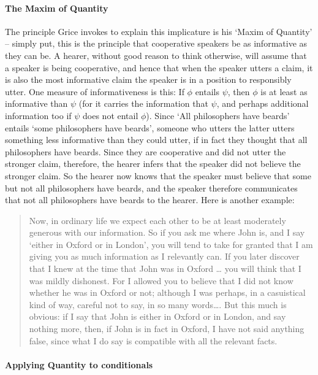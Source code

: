 \paragraph{The Maxim of Quantity}
The principle Grice invokes to explain this implicature is his `Maxim of Quantity' – simply put, this is the principle that cooperative speakers be as informative as they can be. A hearer, without good reason to think otherwise, will assume that a speaker is being cooperative, and hence that when the speaker utters a claim, it is also the most informative claim the speaker is in a position to responsibly utter. One measure of informativeness is this: If $\phi$ entails $\psi$, then $\phi$ is at least as informative than $\psi$ (for it carries the information that $\psi$, and perhaps additional information too if $\psi$ does not entail $\phi$). Since `All philosophers have beards' entails `some philosophers have beards', someone who utters the latter utters something less informative than they could utter, if in fact they thought that all philosophers have beards. Since they are cooperative and did not utter the stronger claim, therefore, the hearer infers that the speaker did not believe the stronger claim. So the hearer now knows that the speaker must believe that some but not all philosophers have beards, and the speaker therefore communicates that not all philosophers have beards to the hearer. Here is another example: \begin{quote}
	Now, in ordinary life we expect each other to be at least moderately generous with our information. So if you ask me where John is, and I say `either in Oxford or in London', you will tend to take for granted that I am giving you as much information as I relevantly can. If you later discover that I knew at the time that John was in Oxford … you will think that I was mildly dishonest. For I allowed you to believe that I did not know whether he was in Oxford or not; although I was perhaps, in a casuistical kind of way, careful not to say, in so many words…. But this much is obvious: if I say that John is either in Oxford or in London, and say nothing more, then, if John is in fact in Oxford, I have not said anything false, since what I do say is compatible with all the relevant facts.\citep[67]{thomson}
\end{quote}

\paragraph{Applying Quantity to conditionals}
  
